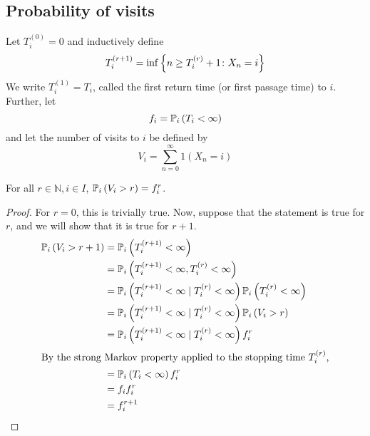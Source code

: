 \subsection{Probability of visits}
\begin{definition}
	Let \( T_i^{(0)} = 0 \) and inductively define
	\[
		T_i^{(r+1)} = \inf \qty{n \geq T_i^{(r)} + 1 \colon X_n = i}
	\]
	We write \( T_i^{(1)} = T_i \), called the first return time (or first passage time) to \( i \).
	Further, let
	\[
		f_i = \mathbb{P}_{i}\left({T_i < \infty}\right)
	\]
	and let the number of visits to \( i \) be defined by
	\[
		V_i = \sum_{n=0}^\infty 1(X_n = i)
	\]
\end{definition}
\begin{lemma}
	For all \( r \in \mathbb N, i \in I \), \( \mathbb{P}_{i}\left({V_i > r}\right) = f_i^r \).
\end{lemma}
\begin{proof}
	For \( r = 0 \), this is trivially true.
	Now, suppose that the statement is true for \( r \), and we will show that it is true for \( r + 1 \).
	\begin{align*}
		\mathbb{P}_{i}\left({V_i > r+1}\right) & = \mathbb{P}_{i}\left({T_i^{(r+1)} < \infty}\right)                                                      \\
		                    & = \mathbb{P}_{i}\left({T_i^{(r+1)} < \infty, T_i^{(r)} < \infty}\right)                                  \\
		                    & = \mathbb{P}_{i}\left({T_i^{(r+1)} < \infty \mid T_i^{(r)} < \infty}\right) \mathbb{P}_{i}\left({T_i^{(r)} < \infty}\right) \\
		                    & = \mathbb{P}_{i}\left({T_i^{(r+1)} < \infty \mid T_i^{(r)} < \infty}\right) \mathbb{P}_{i}\left({V_i > r}\right)            \\
		                    & = \mathbb{P}_{i}\left({T_i^{(r+1)} < \infty \mid T_i^{(r)} < \infty}\right) f_i^r                        \\
		\intertext{By the strong Markov property applied to the stopping time \( T_i^{(r)} \),}
		                    & = \mathbb{P}_{i}\left({T_i < \infty}\right) f_i^r                                                        \\
		                    & = f_i f_i^r                                                                           \\
		                    & = f_i^{r+1}
	\end{align*}
\end{proof}

